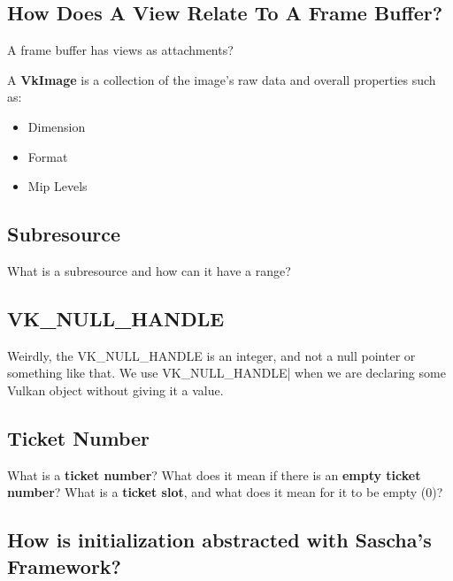 \documentclass{article}
\begin{document}
\subsection*{How Does A View Relate To A Frame Buffer?}
\par A frame buffer has views as attachments?

\par A \textbf{VkImage} is a collection of the image's raw data and
overall properties such as:
\begin{itemize}
  \item Dimension
  \item Format
  \item Mip Levels
\end{itemize}

\subsection*{Subresource}
\par What is a subresource and how can it have a range?

\subsection*{VK\_NULL\_HANDLE}
\par Weirdly, the VK\_NULL\_HANDLE is an integer, and not a null
pointer or something like that. We use VK\_NULL\_HANDLE| when we
are declaring some Vulkan object without giving it a value.

\subsection*{Ticket Number}
What is a \textbf{ticket number}? What does it mean if there is an
\textbf{empty ticket number}? What is a \textbf{ticket slot}, and
what does it mean for it to be empty (0)?

\subsection*{How is initialization abstracted with Sascha's Framework?}
\end{document}
